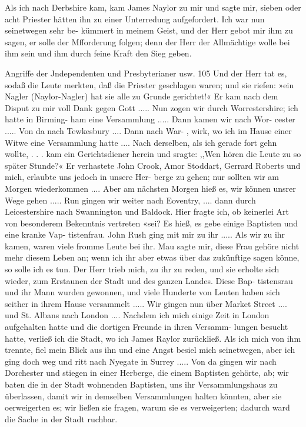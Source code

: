 Als ich nach Derbshire kam, kam James Naylor zu mir
und sagte mir, sieben oder acht Priester hätten ihn zu einer
Unterredung aufgefordert. Ich war nun seinetwegen sehr be-
kümmert in meinem Geist, und der Herr gebot mir ihm zu sagen,
er solle der Mfforderung folgen; denn der Herr der Allmächtige
wolle bei ihm sein und ihm durch feine Kraft den Sieg geben.


Angriffe der Jndependenten und Presbyterianer usw. 105
Und der Herr tat es, sodaß die Leute merkten, daß die Priester
geschlagen waren; und sie riefen: »ein Nagler (Naylor-Nagler)
hat sie alle zu Grunde gerichtet!« Er kam nach dem Disput zu
mir voll Dank gegen Gott .....
Nun zogen wir durch Worrestershire; ich hatte in Birming-
ham eine Versammlung ..... Dann kamen wir nach Wor-
cester ..... Von da nach Tewkesbury .... Dann nach War-
, wirk, wo ich im Hause einer Witwe eine Versammlung hatte ....
Nach derselben, als ich gerade fort gehn wollte, . . . kam ein
Gerichtsdiener herein und sragte: ,,Wen hören die Leute zu so
später Stunde?« Er verhastete John Crook, Amor Stoddart,
Gerrard Roberts und mich, erlaubte uns jedoch in unsere Her-
berge zu gehen; nur sollten wir am Morgen wiederkommen ....
Aber am nächsten Morgen hieß es, wir können unsrer Wege
gehen ..... Run gingen wir weiter nach Eoventry, ....
dann durch Leicestershire nach Swannington und Baldock. Hier
fragte ich, ob keinerlei Art von besonderem Bekenntnis vertreten
«sei? Es hieß, es gebe einige Baptisten und eine kranke Vap-
tistenfrau. John Rush ging mit mir zu ihr ..... Als wir zu
ihr kamen, waren viele fromme Leute bei ihr. Mau sagte mir,
diese Frau gehöre nicht mehr diesem Leben an; wenn ich ihr aber
etwas über das zukünftige sagen könne, so solle ich es tun. Der
Herr trieb mich, zu ihr zu reden, und sie erholte sich wieder,
zum Erstaunen der Stadt und des ganzen Landes. Diese Bap-
tistensrau und ihr Mann wurden gewonnen, und viele Hunderte
von Leuten haben sich seither in ihrem Hause versammelt .....
Wir gingen nun über Market Street .... und St. Albans
nach London .... Nachdem ich mich einige Zeit in London
aufgehalten hatte und die dortigen Freunde in ihren Versamm-
lungen besucht hatte, verließ ich die Stadt, wo ich James Raylor
zurückließ. Als ich mich von ihm trennte, fiel mein Blick aus
ihn und eine Angst besiel mich seinetwegen, aber ich ging doch
weg und ritt nach Nyegate in Surrey .....
Von da gingen wir nach Dorchester und stiegen in einer
Herberge, die einem Baptisten gehörte, ab; wir baten die in der
Stadt wohnenden Baptisten, uns ihr Versammlungshaus zu
überlassen, damit wir in demselben Versammlungen halten könnten,
aber sie oerweigerten es; wir ließen sie fragen, warum sie es
verweigerten; dadurch ward die Sache in der Stadt ruchbar.



